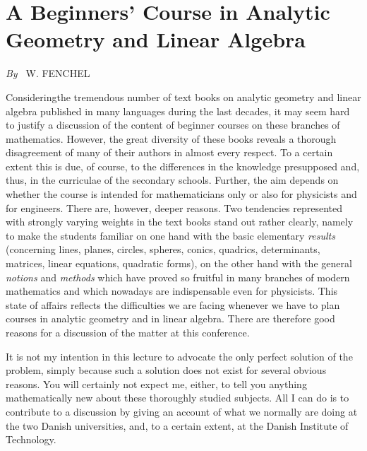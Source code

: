 
\chapter{A Beginners' Course in Analytic Geometry and Linear Algebra}

\begin{center}
{\em By~} W. FENCHEL
\end{center}

Considering\pageoriginale the tremendous number of text books on
analytic geometry and linear algebra published in many languages
during the last decades, it may seem hard to justify a discussion of
the content of beginner courses on these branches of
mathematics. However, the great diversity of these books reveals a
thorough disagreement of many of their authors in almost every
respect. To a certain extent this is due, of course, to the
differences in the knowledge presupposed and, thus, in the curriculae
of the secondary schools. Further, the aim depends on whether the
course is  intended for mathematicians only or also for physicists and
for engineers. There are, however, deeper reasons. Two tendencies
represented with strongly varying weights in the text books stand out
rather clearly, namely to make the students familiar on one hand with
the basic elementary \textit{results} (concerning lines, planes,
circles, spheres, conics, quadrics, determinants, matrices, linear
equations, quadratic forms), on the other hand with the general
\textit{notions} and \textit{methods} which have proved so fruitful in
many branches of modern mathematics and which nowadays are
indispensable even for physicists. This state of affairs reflects the
difficulties we are facing whenever we have to plan courses in
analytic geometry and in linear algebra. There are therefore good
reasons for a discussion of the matter at this conference.

It is not my intention in this lecture to advocate the only perfect
solution of the problem, simply because such a solution does not exist
for several obvious reasons. You will certainly not expect me, either,
to tell you anything mathematically new about these thoroughly studied
subjects. All I can do is to contribute to a discussion by giving an
account of what we normally are doing at the two Danish universities,
and, to a certain extent, at the Danish Institute of Technology.

